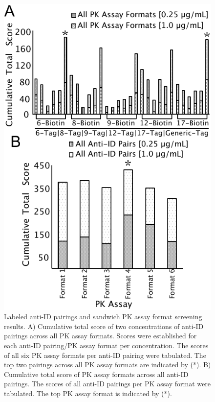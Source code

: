 \begin{figure}[H]
 \centering
 \includegraphics{graphics/ch3/Figure_3.pdf}
 \caption{Labeled anti-ID pairings and sandwich PK assay format screening results. A) Cumulative total score of two concentrations of anti-ID pairings across all PK assay formats.  Scores were established for each anti-ID pairing/PK assay format per concentration.  The scores of all six PK assay formats per anti-ID pairing were tabulated.  The top two pairings across all PK assay formats are indicated by (*).  B) Cumulative total score of PK assay formats across all anti-ID pairings.  The scores of all anti-ID pairings per PK assay format were tabulated.  The top PK assay format is indicated by (*).}
 \end{figure}

